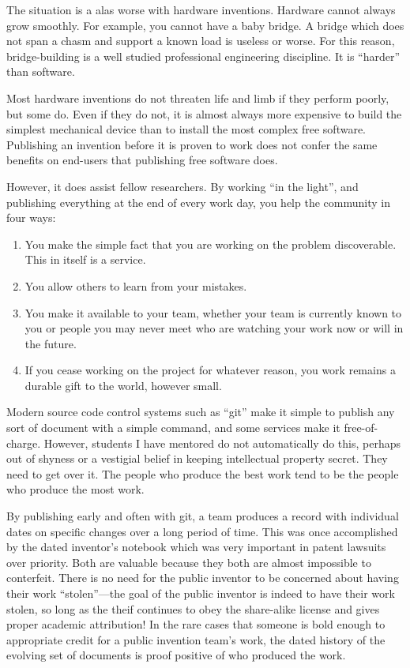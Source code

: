 \documentclass[
	fontsize=10pt, %
	twoside=false, %
	secnumdepth=1, %
]{kaobook}
\begin{document}
The situation is a alas worse with hardware inventions. Hardware cannot
always grow smoothly. For example, you cannot have a baby bridge.
A bridge which does not span a chasm and support a known load is useless
or worse.
For this reason, bridge-building is a well studied professional engineering discipline.
It is ``harder'' than software.

Most hardware inventions do not threaten life and limb if they perform poorly,
but some do.
Even if they do not, it is almost always more expensive to build the simplest
mechanical device than to install the most complex free software.
Publishing an invention before it is proven to work does not confer
the same benefits on end-users that publishing free software does.

However, it does assist fellow researchers. By working ``in the light'',
and publishing everything at the end of every work day, you help the
community in four ways:
\begin{enumerate}
\item You make the simple fact that you are working on the problem discoverable.
  This in itself is a service.
\item You allow others to learn from your mistakes.
\item You make it available to your team, whether your team is currently known to you or
  people you may never meet who are watching your work now or will in the future.
\item If you cease working on the project for whatever reason, you work remains
  a durable gift to the world, however small.
\end{enumerate}

Modern source code control systems such as ``git'' make it simple to publish any sort
of document with a simple command, and some services make it free-of-charge.
However, students I have mentored do not automatically do this, perhaps out of shyness or
a vestigial belief in keeping intellectual property secret. They need to get over it.
The people who produce the best work tend to be the people who produce the most work.

By publishing early and often with git, a team produces a record with individual dates on specific changes over a long period
of time.
This was once accomplished by the dated inventor's notebook which was very important in patent lawsuits over priority.
Both are valuable because they both are almost impossible to conterfeit.
There is no need for the public inventor to be concerned about having their work ``stolen''---the goal of the public inventor
is indeed to have their work stolen, so long as the theif continues to obey the share-alike license and gives
proper academic attribution!
In the rare cases that someone is bold enough to appropriate credit for a public invention team's work, the
dated history of the evolving set of documents is proof positive of who produced the work.
\end{document}
